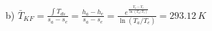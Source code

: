 b)  
\( \bar{T}_{KF} = \frac{\int T_{ds}}{s_a - s_e} = \frac{h_a - h_e}{s_a - s_e} = \frac{e^{\frac{T_a - T_e}{\ln(T_a/T_e)}}}{\ln(T_a/T_e)} = 293.12 \, K \)